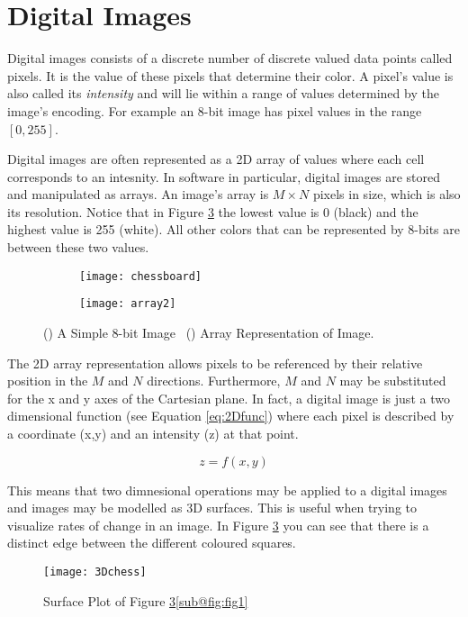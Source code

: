 \section{Digital Images}
Digital images consists of a discrete number of discrete valued data points called pixels. It is the value of these pixels that determine their color. A pixel's value is also called its \emph{intensity} and will lie within a range of values determined by the image's encoding. For example an 8-bit image has pixel values in the range $[0, 255]$. 

Digital images are often represented as a 2D array of values where each cell corresponds to an intesnity. In software in particular,  digital images are stored and manipulated as arrays. An image's array is $M\times N$ pixels in size, which is also its resolution. Notice that in Figure \ref{fig:2Darray} the lowest value is 0 (black) and the highest value is 255 (white). All other colors that can be represented by 8-bits are between these two values.

\begin{figure}[H]
    \centering
    \begin{subfigure}[b]{0.5\linewidth}
      \centering\texttt{[image: chessboard]}
      \caption{\label{fig:fig1}}
    \end{subfigure}%
    \begin{subfigure}[b]{0.5\linewidth}
      \centering\texttt{[image: array2]}
      \caption{\label{fig:fig2}}
    \end{subfigure}
    \caption{() A Simple 8-bit Image ~() Array Representation of Image.}
    \label{fig:2Darray}
\end{figure}
  

The 2D array representation allows pixels to be referenced by their relative position in the $M$ and $N$ directions. Furthermore, $M$ and $N$ may be substituted for the x and y axes of the Cartesian plane. In fact, a digital image is just a two dimensional function (see Equation \ref{eq:2Dfunc}) where each pixel is described by a coordinate (x,y) and an intensity (z) at that point.

\begin{equation}
    z = f(x,y)
    \label{eq:2Dfunc}
\end{equation}

This means that two dimnesional operations may be applied to a digital images and images may be modelled as 3D surfaces. This is useful when trying to visualize rates of change in an image. In Figure \ref{fig:2Darray} you can see that there is a distinct edge between the different coloured squares.

\begin{figure}[ht!]
  \centering
  \centering\texttt{[image: 3Dchess]}
  \caption{\label{fig:fig1} Surface Plot of Figure \ref{fig:2Darray}\ref{sub@fig:fig1}}
\end{figure}




